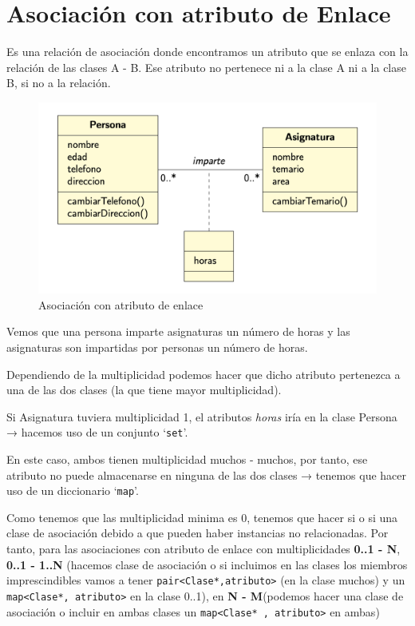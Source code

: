 \chapter{Asociación con atributo de Enlace}
Es una relación de asociación donde encontramos un atributo que se enlaza con la relación de las clases A - B.
Ese atributo no pertenece ni a la clase A ni a la clase B, si no a la relación.
\begin{figure}[h]
	\centering
	\includegraphics[width=\textwidth]{Imagenes/atribenlace.png}
	\caption{Asociación con atributo de enlace}
\end{figure}

Vemos que una persona imparte asignaturas un número de horas y las asignaturas son impartidas por personas un número de horas.

Dependiendo de la multiplicidad podemos hacer que dicho atributo pertenezca a una de las dos clases (la que tiene mayor multiplicidad).

Si Asignatura tuviera multiplicidad 1, el atributos \textit{horas} iría en la clase Persona → hacemos uso de un conjunto ‘\texttt{set}’.

En este caso, ambos tienen multiplicidad muchos - muchos, por tanto, ese atributo no puede almacenarse en ninguna de las dos clases → tenemos que hacer uso de un diccionario ‘\texttt{map}’.

Como tenemos que las multiplicidad minima es 0, tenemos que hacer si o si una clase de asociación debido a que pueden haber instancias no relacionadas. Por tanto, para las asociaciones con atributo de enlace con multiplicidades \textbf{0..1 - N}, \textbf{0..1 - 1..N} (hacemos clase de asociación o si incluimos en las clases los miembros imprescindibles vamos a tener \texttt{pair<Clase*,atributo>} (en la clase muchos) y un \texttt{map<Clase*, atributo>} en la clase 0..1), en  \textbf{N - M}(podemos hacer una clase de asociación o incluir en ambas clases un \texttt{map<Clase* , atributo>} en ambas)

